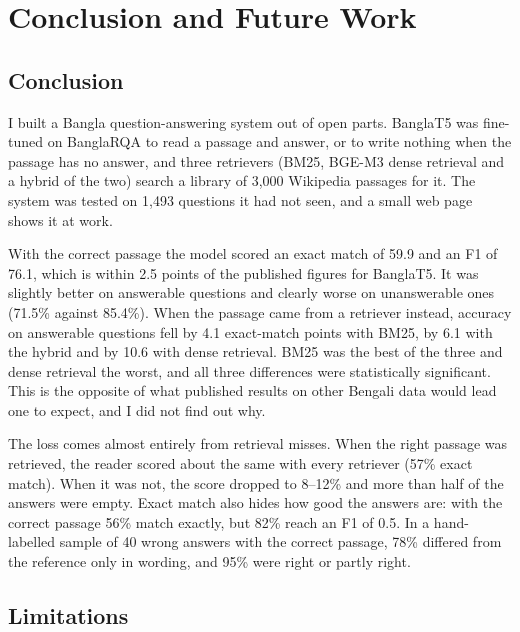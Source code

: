 \chapter{Conclusion and Future Work}

\section{Conclusion}

I built a Bangla question-answering system out of open parts. BanglaT5 was fine-tuned on BanglaRQA to read a passage and answer, or to write nothing when the passage has no answer, and three retrievers (BM25, BGE-M3 dense retrieval and a hybrid of the two) search a library of 3,000 Wikipedia passages for it. The system was tested on 1,493 questions it had not seen, and a small web page shows it at work.

With the correct passage the model scored an exact match of 59.9 and an F1 of 76.1, which is within 2.5 points of the published figures for BanglaT5. It was slightly better on answerable questions and clearly worse on unanswerable ones (71.5\% against 85.4\%). When the passage came from a retriever instead, accuracy on answerable questions fell by 4.1 exact-match points with BM25, by 6.1 with the hybrid and by 10.6 with dense retrieval. BM25 was the best of the three and dense retrieval the worst, and all three differences were statistically significant. This is the opposite of what published results on other Bengali data would lead one to expect, and I did not find out why.

The loss comes almost entirely from retrieval misses. When the right passage was retrieved, the reader scored about the same with every retriever (57\% exact match). When it was not, the score dropped to 8--12\% and more than half of the answers were empty. Exact match also hides how good the answers are: with the correct passage 56\% match exactly, but 82\% reach an F1 of 0.5. In a hand-labelled sample of 40 wrong answers with the correct passage, 78\% differed from the reference only in wording, and 95\% were right or partly right.

\section{Limitations}

